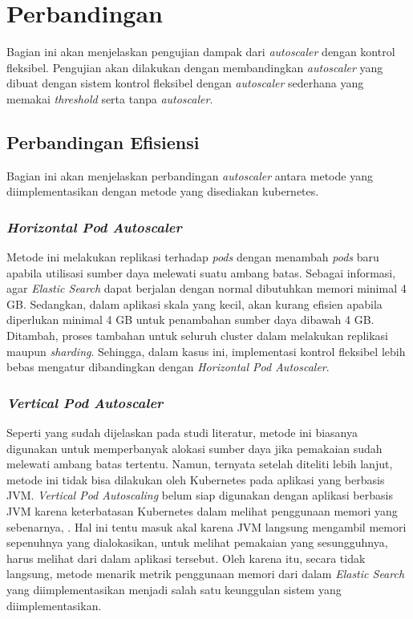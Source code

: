 \section{Perbandingan}

Bagian ini akan menjelaskan pengujian dampak dari \textit{autoscaler} dengan kontrol fleksibel. Pengujian akan dilakukan dengan membandingkan \textit{autoscaler} yang dibuat dengan sistem kontrol fleksibel dengan \textit{autoscaler} sederhana yang memakai \textit{threshold} serta tanpa \textit{autoscaler}. 


\subsection{Perbandingan Efisiensi}

Bagian ini akan menjelaskan perbandingan \textit{autoscaler} antara metode yang diimplementasikan dengan metode yang disediakan kubernetes.

\subsubsection{\textit{Horizontal Pod Autoscaler}}

Metode ini melakukan replikasi terhadap \textit{pods} dengan menambah \textit{pods} baru apabila utilisasi sumber daya melewati suatu ambang batas. Sebagai informasi, agar \textit{Elastic Search} dapat berjalan dengan normal dibutuhkan memori minimal 4 GB. Sedangkan, dalam aplikasi skala yang kecil, akan kurang efisien apabila diperlukan minimal 4 GB untuk penambahan sumber daya dibawah 4 GB. Ditambah, proses tambahan untuk seluruh cluster dalam melakukan replikasi maupun \textit{sharding}. Sehingga, dalam kasus ini, implementasi kontrol fleksibel lebih bebas mengatur dibandingkan dengan \textit{Horizontal Pod Autoscaler}.

\subsubsection{\textit{Vertical Pod Autoscaler}}

Seperti yang sudah dijelaskan pada studi literatur, metode ini biasanya digunakan untuk memperbanyak alokasi sumber daya jika pemakaian sudah melewati ambang batas tertentu. Namun, ternyata setelah diteliti lebih lanjut, metode ini tidak bisa dilakukan oleh Kubernetes pada aplikasi yang berbasis JVM. \textit{Vertical Pod Autoscaling} belum siap digunakan dengan aplikasi berbasis JVM karena keterbatasan Kubernetes dalam melihat penggunaan memori yang sebenarnya, \parencite{googlevpajvm}. Hal ini tentu masuk akal karena JVM langsung mengambil memori sepenuhnya yang dialokasikan, untuk melihat pemakaian yang sesungguhnya, harus melihat dari dalam aplikasi tersebut. Oleh karena itu, secara tidak langsung, metode menarik metrik penggunaan memori dari dalam \textit{Elastic Search} yang diimplementasikan menjadi salah satu keunggulan sistem yang diimplementasikan.